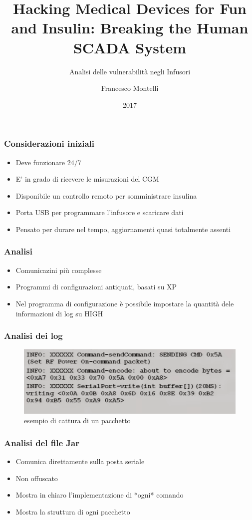 \documentclass{beamer}
\title{Hacking Medical Devices for Fun and Insulin: Breaking the Human 
SCADA System}
\subtitle{Analisi delle vulnerabilità negli Infusori}
\author{Francesco Montelli}
\institute{CeSeNa}
\date{2017}
\begin{document}
 
\frame{\titlepage}

\begin{frame}
\frametitle{Considerazioni iniziali}
	\begin{itemize}
		\item Deve funzionare 24/7
		\item E' in grado di ricevere le misurazioni del CGM
		\item Disponibile un controllo remoto per somministrare insulina
		\item Porta USB per programmare l'infusore e scaricare dati
		\item Pensato per durare nel tempo, aggiornamenti quasi totalmente assenti
	\end{itemize}
\end{frame}

\begin{frame}
\frametitle{Analisi}
	\begin{itemize}
		\item Comunicazini più complesse
		\item Programmi di configurazioni antiquati, basati su XP
		\item Nel programma di configurazione è possibile impostare la quantità dele informazioni di log su HIGH
	\end{itemize}
\end{frame}

\begin{frame}
\frametitle{Analisi dei log}
	\begin{figure}
		\centerline{\includegraphics[scale=0.4]{log}}
		\caption{esempio di cattura di un pacchetto}
	\end{figure}
\end{frame}

\begin{frame}
\frametitle{Analisi del file Jar}
	\begin{itemize}
		\item Comunica direttamente sulla posta seriale
		\item Non offuscato
		\item Mostra in chiaro l'implementazione di *ogni* comando
		\item Mostra la struttura di ogni pacchetto
	\end{itemize}
\end{frame}
\end{document}
